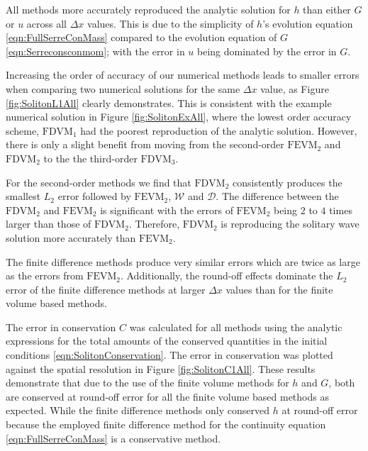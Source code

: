 All methods more accurately reproduced the analytic solution for $h$ than either $G$ or $u$ across all $\Delta x$ values. This is due to the simplicity of $h$'s evolution equation \eqref{eqn:FullSerreConMass} compared to the evolution equation of $G$ \eqref{eqn:Serreconsconmom}; with the error in $u$ being dominated by the error in $G$. 

Increasing the order of accuracy of our numerical methods leads to smaller errors when comparing two numerical solutions for the same $\Delta x$ value, as Figure \ref{fig:SolitonL1All} clearly demonstrates. This is consistent with the example numerical solution in Figure \ref{fig:SolitonExAll}, where the lowest order accuracy scheme, $\text{FDVM}_1$ had the poorest reproduction of the analytic solution. However, there is only a slight benefit from moving from the second-order $\text{FEVM}_2$ and $\text{FDVM}_2$ to the  the third-order $\text{FDVM}_3$.

For the second-order methods we find that $\text{FDVM}_2$ consistently produces the smallest $L_2$ error followed by $\text{FEVM}_2$, $\mathcal{W}$ and $\mathcal{D}$. The difference between the $\text{FDVM}_2$ and $\text{FEVM}_2$ is significant with the errors of $\text{FEVM}_2$ being $2$ to $4$ times larger than those of $\text{FDVM}_2$. Therefore, $\text{FDVM}_2$ is reproducing the solitary wave solution more accurately than $\text{FEVM}_2$.

The finite difference methods produce very similar errors which are twice as large as the errors from $\text{FEVM}_2$. Additionally, the round-off effects dominate the $L_2$ error of the finite difference methods at larger $\Delta x$ values than for the finite volume based methods.

The error in conservation $C$ was calculated for all methods using the analytic expressions for the total amounts of the conserved quantities in the initial conditions \eqref{eqn:SolitonConservation}. The error in conservation was plotted against the spatial resolution in Figure \ref{fig:SolitonC1All}. These results demonstrate that due to the use of the finite volume methods for $h$ and $G$, both are conserved at round-off error for all the finite volume based methods as expected. While the finite difference methods only conserved $h$ at round-off error because the employed finite difference method for the continuity equation \eqref{eqn:FullSerreConMass} is a conservative method. 

